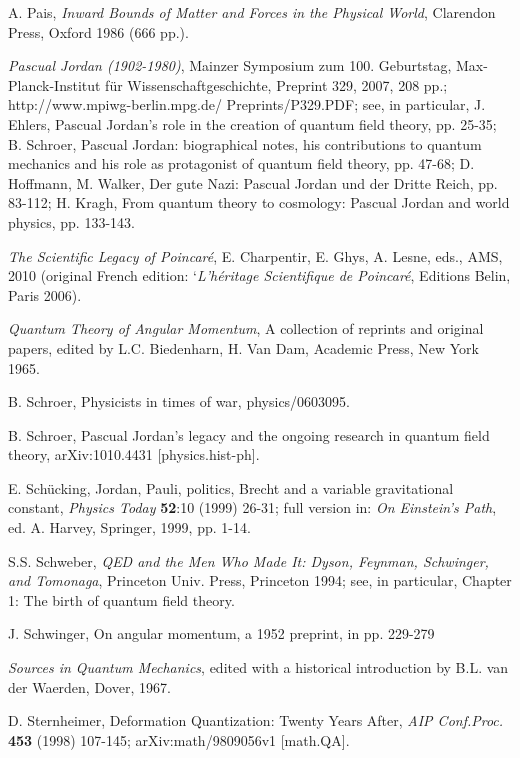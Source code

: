 \documentclass[12pt]{article}
\begin{document}
\begin{thebibliography}{000}
 A. Pais, {\it Inward Bounds of Matter and Forces in the
Physical World}, Clarendon Press, Oxford 1986 (666 pp.).

 {\it Pascual Jordan (1902-1980)}, Mainzer Symposium zum
100. Geburtstag, Max-Planck-Institut f\"ur Wissenschaftgeschichte, Preprint 329,
 2007, 208 pp.; http://www.mpiwg-berlin.mpg.de/  Preprints/P329.PDF; see, in
particular, J. Ehlers, Pascual Jordan's role in the creation of quantum  field
theory, pp. 25-35; B. Schroer, Pascual Jordan: biographical notes, his
contributions to quantum mechanics and his role as protagonist of quantum field
 theory, pp. 47-68; D. Hoffmann, M. Walker, Der gute Nazi: Pascual Jordan und
der Dritte Reich, pp. 83-112; H. Kragh, From quantum theory to cosmology:
Pascual Jordan and world physics, pp. 133-143.

 {\it The Scientific Legacy of Poincar\'e}, E.
Charpentir, E. Ghys, A. Lesne, eds., AMS, 2010 (original French edition: 
`{\it L'h\'eritage Scientifique de Poincar\'e}, Editions Belin, Paris 2006).
 
 {\it Quantum Theory of Angular Momentum}, A collection of
reprints and original papers, edited by L.C. Biedenharn, H. Van Dam, Academic
Press, New York 1965.

 B. Schroer, Physicists in times of war, physics/0603095.

 B. Schroer, Pascual Jordan's legacy and the ongoing research
in quantum field theory, arXiv:1010.4431 [physics.hist-ph].

 E. Sch\"ucking, Jordan, Pauli, politics, Brecht and a
variable gravitational constant, {\it Physics Today} {\bf 52}:10 (1999) 26-31;
full version in: {\it On Einstein's Path}, ed. A. Harvey, Springer, 1999,
pp. 1-14.

 S.S. Schweber, {\it QED and the Men Who Made It: Dyson,
Feynman, Schwinger, and Tomonaga}, Princeton Univ. Press, Princeton 1994; see,
in particular, Chapter 1: The birth of quantum field theory.

 J. Schwinger, On angular momentum, a 1952 preprint, in
\cite{QTAM} pp. 229-279

 {\it Sources in Quantum Mechanics}, edited with a historical
introduction by B.L. van der Waerden, Dover, 1967.

 D. Sternheimer, Deformation Quantization: Twenty Years After,
{\it AIP Conf.Proc.} {\bf 453} (1998) 107-145; 	arXiv:math/9809056v1 [math.QA].


\end{thebibliography}
\end{document}
